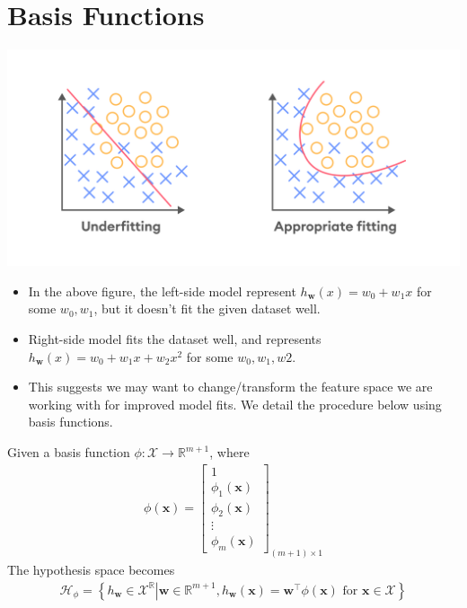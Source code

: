 \documentclass{report}
\newcommand{\w}{\mathbf{w}} %
\newcommand{\x}{\mathbf{x}}
\begin{document}

\newpage
\section{Basis Functions}

\begin{center}
  \includegraphics[scale=0.25]{images/03.png}
\end{center}

\begin{itemize}
  \item In the above figure, the left-side model represent  \( h_\w(x) = w_0 + w_1x \) for some \(w_0, w_1\), but it doesn't fit the given dataset well.
  \item Right-side model fits the dataset well, and represents \( h_\w(x) = w_0 + w_1x + w_2x^2 \) for some \(w_0, w_1, w2\).
  \item This suggests we may want to change/transform the feature space we are working with for improved model fits. We detail the procedure below using basis functions.
\end{itemize}

Given a basis function $\phi:\mathcal{X}\rightarrow \mathbb{R}^{m + 1}$, where
\begin{align*}
  \phi(\x) =
  \begin{bmatrix}
    1          \\
    \phi_1(\x) \\
    \phi_2(\x) \\
    \vdots     \\
    \phi_m(\x)
  \end{bmatrix}_{(m + 1)\times 1}
\end{align*}
The hypothesis space becomes
\begin{align*}
  \mathcal{H}_\phi = \left\{\left.h_\mathbf{w} \in \mathcal{X}^\mathbb{R}\right|\mathbf{w}\in\mathbb{R}^{m + 1}, h_\mathbf{w}(\x) = \mathbf{w}^\top\phi(\x)\text{ for }\x \in \mathcal{X}\right\}
\end{align*}
\end{document}
